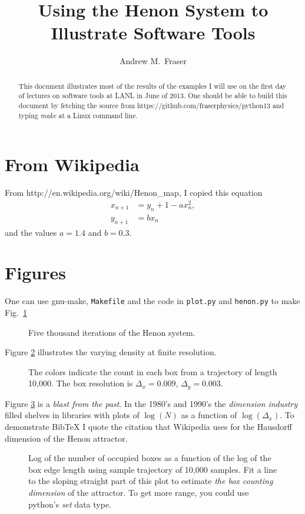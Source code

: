 \documentclass[twocolumn]{article}
\title{Using the Henon System to Illustrate Software Tools}
\author{Andrew M.\ Fraser}
\begin{document}
\maketitle
\begin{abstract}
  This document illustrates most of the results of the examples I will
  use on the first day of lectures on software tools at LANL in June
  of 2013.  One should be able to build this document by fetching the
  source from https://github.com/fraserphysics/python13 and typing
  \emph{make} at a Linux command line.
\end{abstract}

\section{From Wikipedia}
\label{sec:wikipedia}

From http://en.wikipedia.org/wiki/Henon\_map, I copied this equation
\begin{align*}
   x_{n+1} &= y_n+1-a x_n^2,\\
  y_{n+1} &= b x_n
\end{align*}
and the values $a = 1.4$ and $b = 0.3$.

\section{Figures}
\label{sec:figures}

One can use gnu-make, \texttt{Makefile} and the code in \texttt{plot.py} and
\texttt{henon.py} to make Fig.~\ref{fig:dots}
\begin{figure}
  \centering
  \caption{Five thousand iterations of the Henon system.}
  \label{fig:dots}
\end{figure}

Figure \ref{fig:colors} illustrates the varying density at finite
resolution.
\begin{figure}
  \centering
  \caption{The colors indicate the count in each box from a
    trajectory of length 10,000.  The box
    resolution is $\Delta_x = 0.009$, $\Delta_y=0.003$. }
  \label{fig:colors}
\end{figure}

Figure \ref{fig:dim} is a \emph{blast from the past}.  In the 1980's
and 1990's the \emph{dimension industry} filled shelves in libraries
with plots of $\log(N)$ as a function of $\log(\Delta_x)$.  To
demonstrate BibTeX I quote the citation\cite{russell1980} that
Wikipedia uses for the Hausdorff dimension of the Henon attractor.
\begin{figure}
  \centering
  \caption{Log of the number of occupied boxes as a function of the log
    of the box edge length using sample trajectory of 10,000 samples.
    Fit a line to the sloping straight part of this plot to estimate
    \emph{the box counting dimension} of the attractor.  To get more
    range, you could use python's \emph{set} data type.}
  \label{fig:dim}
\end{figure}
\end{document}

